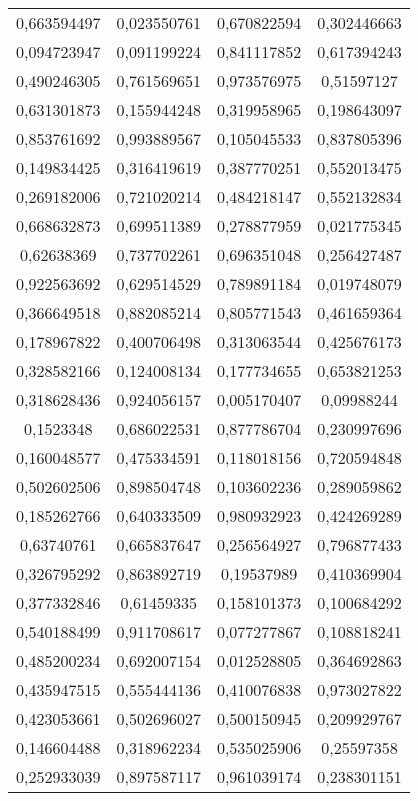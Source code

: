 \documentclass[a4paper,14pt]{extarticle}
\begin{document}
\begin{longtable}{|c|c|c|c|}
	0,663594497 & 0,023550761 & 0,670822594 & 0,302446663 \\
	0,094723947 & 0,091199224 & 0,841117852 & 0,617394243 \\
	0,490246305 & 0,761569651 & 0,973576975 & 0,51597127 \\
	0,631301873 & 0,155944248 & 0,319958965 & 0,198643097 \\
	0,853761692 & 0,993889567 & 0,105045533 & 0,837805396 \\
	0,149834425 & 0,316419619 & 0,387770251 & 0,552013475 \\
	0,269182006 & 0,721020214 & 0,484218147 & 0,552132834 \\
	0,668632873 & 0,699511389 & 0,278877959 & 0,021775345 \\
	0,62638369 & 0,737702261 & 0,696351048 & 0,256427487 \\
	0,922563692 & 0,629514529 & 0,789891184 & 0,019748079 \\
	0,366649518 & 0,882085214 & 0,805771543 & 0,461659364 \\
	0,178967822 & 0,400706498 & 0,313063544 & 0,425676173 \\
	0,328582166 & 0,124008134 & 0,177734655 & 0,653821253 \\
	0,318628436 & 0,924056157 & 0,005170407 & 0,09988244 \\
	0,1523348 & 0,686022531 & 0,877786704 & 0,230997696 \\
	0,160048577 & 0,475334591 & 0,118018156 & 0,720594848 \\
	0,502602506 & 0,898504748 & 0,103602236 & 0,289059862 \\
	0,185262766 & 0,640333509 & 0,980932923 & 0,424269289 \\
	0,63740761 & 0,665837647 & 0,256564927 & 0,796877433 \\
	0,326795292 & 0,863892719 & 0,19537989 & 0,410369904 \\
	0,377332846 & 0,61459335 & 0,158101373 & 0,100684292 \\
	0,540188499 & 0,911708617 & 0,077277867 & 0,108818241 \\
	0,485200234 & 0,692007154 & 0,012528805 & 0,364692863 \\
	0,435947515 & 0,555444136 & 0,410076838 & 0,973027822 \\
	0,423053661 & 0,502696027 & 0,500150945 & 0,209929767 \\
	0,146604488 & 0,318962234 & 0,535025906 & 0,25597358 \\
	0,252933039 & 0,897587117 & 0,961039174 & 0,238301151 \\

\end{longtable}
\end{document}
